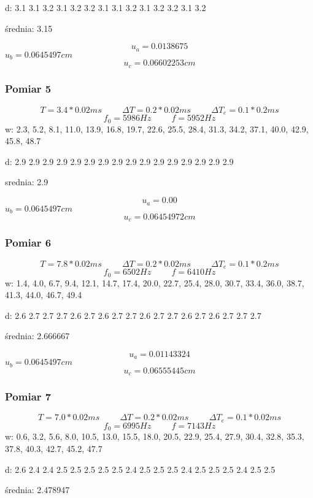 \documentclass[12pt,a4paper]{article}
\begin{document}
d: 3.1 3.1 3.2 3.1 3.2 3.2 3.1 3.1 3.2 3.1 3.2 3.2 3.1 3.2

średnia: 3.15

$$
u_a = 0.0138675
$$
$u_b = 0.0645497cm $
$$u_c = 0.06602253cm $$
\subsubsection{Pomiar 5}
$$
T = 3.4*0.02ms \hspace{1cm} \Delta T = 0.2*0.02ms \hspace{1cm} \Delta T_e = 0.1*0.2ms 
$$
$$
f_0 = 5986 Hz \hspace{1cm} f=5952Hz
$$
w: 2.3, 5.2, 8.1, 11.0, 13.9, 16.8, 19.7, 22.6, 25.5, 28.4, 31.3, 34.2, 37.1, 40.0, 42.9, 45.8, 48.7

d: 2.9 2.9 2.9 2.9 2.9 2.9 2.9 2.9 2.9 2.9 2.9 2.9 2.9 2.9 2.9 2.9

srednia: 2.9

$$
u_a = 0.00
$$
$u_b = 0.0645497cm $
$$u_c = 0.06454972cm $$
\subsubsection{Pomiar 6}
$$
T = 7.8*0.02ms \hspace{1cm} \Delta T = 0.2*0.02ms \hspace{1cm} \Delta T_e = 0.1*0.2ms 
$$
$$
f_0 = 6502 Hz \hspace{1cm} f=6410Hz
$$
w: 1.4, 4.0, 6.7, 9.4, 12.1, 14.7, 17.4, 20.0, 22.7, 25.4, 28.0, 30.7, 33.4, 36.0, 38.7, 41.3, 44.0, 46.7, 49.4

d: 2.6 2.7 2.7 2.7 2.6 2.7 2.6 2.7 2.7 2.6 2.7 2.7 2.6 2.7 2.6 2.7 2.7 2.7

średnia: 2.666667

$$
u_a = 0.01143324
$$
$u_b = 0.0645497cm $
$$u_c = 0.06555445cm $$
\subsubsection{Pomiar 7}
$$
T = 7.0*0.02ms \hspace{1cm} \Delta T = 0.2*0.02ms \hspace{1cm} \Delta T_e = 0.1*0.02ms 
$$
$$
f_0 = 6995 Hz \hspace{1cm} f=7143Hz
$$
w: 0.6, 3.2, 5.6, 8.0, 10.5, 13.0, 15.5, 18.0, 20.5, 22.9, 25.4, 27.9, 30.4, 32.8, 35.3, 37.8, 40.3, 42.7, 45.2, 47.7

d: 2.6 2.4 2.4 2.5 2.5 2.5 2.5 2.5 2.4 2.5 2.5 2.5 2.4 2.5 2.5 2.5 2.4 2.5 2.5

średnia: 2.478947
\end{document}
